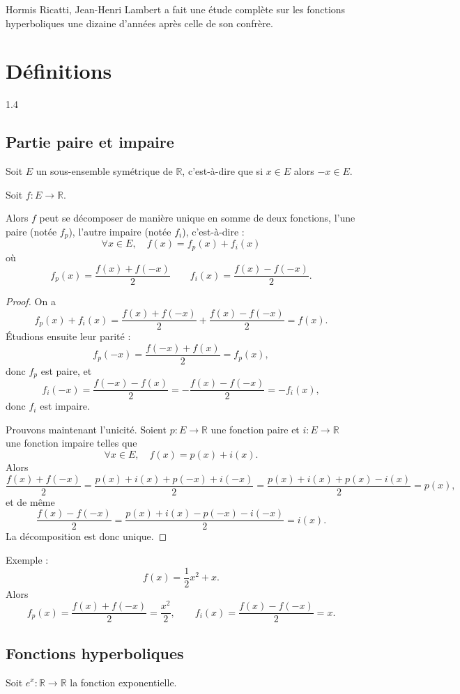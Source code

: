 \documentclass{article}
\begin{document}
Hormis Ricatti, Jean-Henri Lambert a fait une étude complète sur les fonctions hyperboliques une dizaine d'années après celle de son confrère.

\section{Définitions}

\begin{spacing}{1.4}

\subsection{Partie paire et impaire}
\begin{tcolorbox}[colframe=blue!75!black,colback=blue!5!white,title=Décomposition de fonctions]
Soit $E$ un sous-ensemble symétrique de $\mathbb{R}$, c'est-à-dire que si $x \in E$ alors $-x \in E$.

Soit $f:E\rightarrow \mathbb{R}$.

Alors $f$ peut se décomposer de manière unique en somme de deux fonctions, l'une paire (notée $f_p$), l'autre impaire (notée $f_i$), c'est-à-dire :
\[
\forall x \in E,\quad f(x)=f_p(x)+f_i(x)
\]
où
\[
f_p(x)=\frac{f(x)+f(-x)}{2}
\qquad
f_i(x)=\frac{f(x)-f(-x)}{2}.
\]
\end{tcolorbox}

\begin{proof}
On a
\[
f_p(x)+f_i(x)
=\frac{f(x)+f(-x)}{2}+\frac{f(x)-f(-x)}{2}
=f(x).
\]
Étudions ensuite leur parité :
\[
f_p(-x)=\frac{f(-x)+f(x)}{2}=f_p(x),
\]
donc $f_p$ est paire, et
\[
f_i(-x)=\frac{f(-x)-f(x)}{2}=-\frac{f(x)-f(-x)}{2}=-f_i(x),
\]
donc $f_i$ est impaire.

Prouvons maintenant l'unicité. Soient $p:E\to\mathbb{R}$ une fonction paire et $i:E\to\mathbb{R}$ une fonction impaire telles que
\[
\forall x\in E,\quad f(x)=p(x)+i(x).
\]
Alors
\[
\frac{f(x)+f(-x)}{2}
=\frac{p(x)+i(x)+p(-x)+i(-x)}{2}
=\frac{p(x)+i(x)+p(x)-i(x)}{2}
=p(x),
\]
et de même
\[
\frac{f(x)-f(-x)}{2}
=\frac{p(x)+i(x)-p(-x)-i(-x)}{2}
=i(x).
\]
La décomposition est donc unique.
\end{proof}

Exemple :
\[
f(x)=\frac12 x^2+x.
\]
Alors
\[
f_p(x)=\frac{f(x)+f(-x)}{2}=\frac{x^2}{2},
\qquad
f_i(x)=\frac{f(x)-f(-x)}{2}=x.
\]

\subsection{Fonctions hyperboliques}
\begin{tcolorbox}[colframe=blue!75!black,colback=blue!5!white,title=Fonctions hyperboliques]
Soit $e^x : \mathbb{R} \rightarrow \mathbb{R}$ la fonction exponentielle.


\end{tcolorbox}
\end{spacing}
\end{document}
